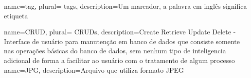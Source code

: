 




 

 {
    name=tag,
    plural= {tags},
    description={Um marcador, a palavra em inglês significa etiqueta}
}

 {
    name=CRUD,
    plural= {CRUDs},
    description={Create Retrieve Update Delete - Interface de usuário para manutenção em banco de dados que consiste somente nas operações básicas do banco de dados, sem nenhum tipo de inteligencia adicional de forma a facilitar ao usuário com o tratamento de algum processo}
}
 {
    name=JPG,
    description={Arquivo que utiliza formato JPEG}
}


                
